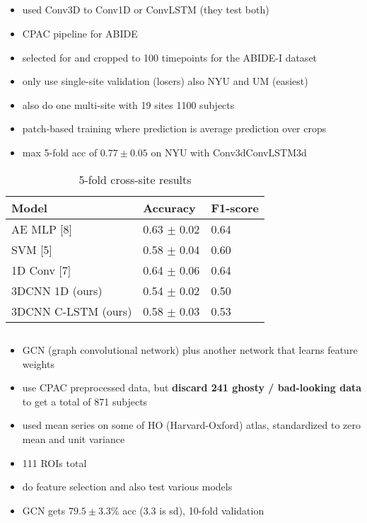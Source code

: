 \documentclass[10pt]{article}
\begin{document}
\subsection{\citet{el-gazzarHybrid3DCNN3DCLSTM2019}}

\begin{itemize}
  \item used Conv3D to Conv1D or ConvLSTM (they test both)
  \item CPAC pipeline for ABIDE
  \item selected for and cropped to 100 timepoints for the ABIDE-I dataset
  \item only use single-site validation (losers) also NYU and UM (easiest)
  \item also do one multi-site with 19 sites 1100 subjects
  \item patch-based training where prediction is average prediction over crops
  \item max 5-fold acc of \(0.77 \pm 0.05\) on NYU with Conv3dConvLSTM3d
\end{itemize}

\begin{table}
\caption{\citet{el-gazzarHybrid3DCNN3DCLSTM2019} 5-fold cross-site results}
\centering
  \begin{tabular}{lll}
    \toprule
    Model     & Accuracy     & F1-score \\
    \midrule
    AE MLP        [8]   &  0.63 \(\pm\) 0.02  & 0.64 \\
    SVM           [5]   &  0.58 \(\pm\) 0.04  & 0.60 \\
    1D Conv       [7]   &  0.64 \(\pm\) 0.06  & 0.64 \\
    3DCNN 1D     (ours) &  0.54 \(\pm\) 0.02  & 0.50 \\
    3DCNN C-LSTM (ours) &  0.58 \(\pm\) 0.03  & 0.53 \\

    \bottomrule
  \end{tabular}
  \label{tab:table}
\end{table}

\subsection{\citet{shaoClassificationASDBased2021}}

\begin{itemize}
  \item GCN (graph convolutional network) plus another network that learns feature weights
  \item use CPAC preprocessed data, but \textbf{discard 241 ghosty / bad-looking data} to get a
  total of 871 subjects
  \item used mean series on some of HO (Harvard-Oxford) atlas, standardized to zero mean and unit variance
  \item 111 ROIs total
  \item do feature selection and also test various models
  \item GCN gets \(79.5\pm3.3\)\% acc (3.3 is sd), 10-fold validation
\end{itemize}
\end{document}
